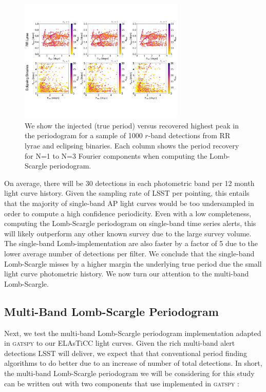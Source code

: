 \documentclass[DM,authoryear,toc]{lsstdoc}
\begin{document}
\begin{figure}
  \includegraphics[width=0.7\textwidth]{figures/singleband_lsp.pdf}
  \centering 
  \caption{We show the injected (true period) versus recovered highest peak in the periodogram for a sample of 1000 $r$-band detections from RR lyrae and eclipsing binaries. Each column shows the period recovery for N=1 to N=3 Fourier components when computing the Lomb-Scargle periodogram.}
  \label{fig:single_band_lsp}
\end{figure}

On average, there will be 30 detections in each photometric band per 12 month light curve history. Given the sampling rate of LSST per pointing, this entails that the majority of single-band AP light curves would be too undersampled in order to compute a high confidence periodicity. Even with a low completeness, computing the Lomb-Scargle periodogram on single-band time series alerts, this will likely outperform any other known survey due to the large survey volume. The single-band Lomb-implementation are also faster by a factor of 5 due to the lower average number of detections per filter. We conclude that the single-band Lomb-Scargle misses by a higher margin the underlying true period due the small light curve photometric history. We now turn our attention to the multi-band Lomb-Scargle.

\subsection{Multi-Band Lomb-Scargle Periodogram}
Next, we test the multi-band Lomb-Scargle periodogram implementation adapted in \textsc{gatspy} to our ELAsTiCC light curves. Given the rich multi-band alert detections LSST will deliver, we expect that that conventional period finding algorithms to do better due to an increase of number of total detections. In short, the multi-band Lomb-Scargle periodogram we will be considering for this study can be written out with two components that use implemented in \textsc{gatspy} : 
\end{document}
